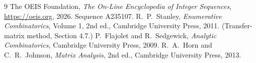 \documentclass[11pt,a4paper]{article}
\theoremstyle{plain}
\theoremstyle{definition}
\begin{document}
\begin{thebibliography}{9}
 The OEIS Foundation, \emph{The On-Line Encyclopedia of Integer
Sequences}, \url{https://oeis.org}, 2026. Sequence A235107.
 R.~P.~Stanley, \emph{Enumerative Combinatorics}, Volume 1, 2nd ed.,
Cambridge University Press, 2011. (Transfer-matrix method, Section 4.7.)
 P.~Flajolet and R.~Sedgewick, \emph{Analytic Combinatorics}, Cambridge
University Press, 2009.
 R.~A.~Horn and C.~R.~Johnson, \emph{Matrix Analysis}, 2nd ed., Cambridge
University Press, 2013.
\end{thebibliography}
\end{document}
